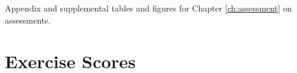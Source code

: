 \documentclass[../main.tex]{subfiles}
\begin{document}
Appendix and supplemental tables and figures for Chapter \ref{ch:assessment} on assessments.

\section{Exercise Scores}
    \label{ase:exercise-score-results}
\end{document}
